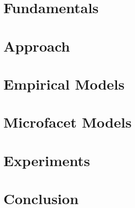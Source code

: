 \documentclass[11pt, a4paper,oneside]{book}
\begin{document}
	\chapter{Fundamentals}
	
	\chapter{Approach}
	
	\chapter{Empirical Models}
	
	\chapter{Microfacet Models}
	
	\chapter{Experiments}
	
	\chapter{Conclusion}
	
 	\nocite{*}
	
	
	\printindex
\end{document}
